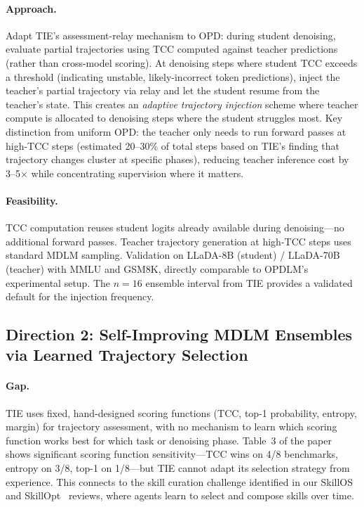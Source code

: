 \documentclass[11pt,a4paper]{article}
\begin{document}
\paragraph{Approach.} Adapt TIE's assessment-relay mechanism to OPD: during student denoising, evaluate partial trajectories using TCC computed against teacher predictions (rather than cross-model scoring). At denoising steps where student TCC exceeds a threshold (indicating unstable, likely-incorrect token predictions), inject the teacher's partial trajectory via relay and let the student resume from the teacher's state. This creates an \emph{adaptive trajectory injection} scheme where teacher compute is allocated to denoising steps where the student struggles most. Key distinction from uniform OPD: the teacher only needs to run forward passes at high-TCC steps (estimated 20--30\% of total steps based on TIE's finding that trajectory changes cluster at specific phases), reducing teacher inference cost by 3--5$\times$ while concentrating supervision where it matters.

\paragraph{Feasibility.} TCC computation reuses student logits already available during denoising---no additional forward passes. Teacher trajectory generation at high-TCC steps uses standard MDLM sampling. Validation on LLaDA-8B (student) / LLaDA-70B (teacher) with MMLU and GSM8K, directly comparable to OPDLM's experimental setup. The $n=16$ ensemble interval from TIE provides a validated default for the injection frequency.

\subsection{Direction 2: Self-Improving MDLM Ensembles via Learned Trajectory Selection}

\paragraph{Gap.} TIE uses fixed, hand-designed scoring functions (TCC, top-1 probability, entropy, margin) for trajectory assessment, with no mechanism to learn which scoring function works best for which task or denoising phase. Table~3 of the paper shows significant scoring function sensitivity---TCC wins on 4/8 benchmarks, entropy on 3/8, top-1 on 1/8---but TIE cannot adapt its selection strategy from experience. This connects to the skill curation challenge identified in our SkillOS~\cite{chen2026skillos} and SkillOpt~\cite{li2026skillopt} reviews, where agents learn to select and compose skills over time.
\end{document}
